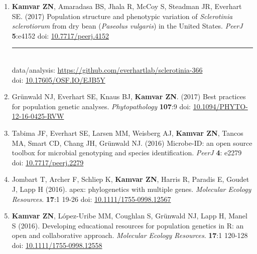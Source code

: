 \begin{enumerate}[leftmargin = 14pt]
	\vspace{3pt}
  
	\item \textbf{Kamvar ZN}, Amaradasa BS, Jhala R, McCoy S, Steadman JR,
	Everhart SE. (2017) Population structure and phenotypic variation of
	\textit{Sclerotinia sclerotiorum} from dry bean (\textit{Paseolus vulgaris})
	in the United States. \textit{PeerJ} \textbf{5}:e4152 doi: \href{https://doi.org/10.7717/peerj.4152}{10.7717/peerj.4152}\\
	\rule[0.25\baselineskip]{0.25\textwidth}{0.5pt}\\
	data/analysis: \href{https://github.com/everhartlab/sclerotinia-366#readme}{https://github.com/everhartlab/sclerotinia-366}\\
	doi:\phantom{t/analysis:}
	\href{https://doi.org/10.17605/OSF.IO/EJB5Y}{10.17605/OSF.IO/EJB5Y}

	\vspace{3pt}

	\item Gr\"unwald NJ, Everhart SE, Knaus BJ, \textbf{Kamvar ZN}. (2017)
	Best practices for population genetic analyses. \textit{Phytopathology}
	\textbf{107}:9 doi: \href{http://doi.org/10.1094/PHYTO-12-16-0425-RVW}{10.1094/PHYTO-12-16-0425-RVW}

	\vspace{3pt}

	\item Tabima JF, Everhart SE, Larsen MM, Weisberg AJ, \textbf{Kamvar ZN}, Tancos MA,
	Smart CD, Chang JH, Gr\"unwald NJ. (2016) Microbe-ID: an open source toolbox
	for microbial genotyping and species identification. \textit{PeerJ} \textbf{4}: e2279
	doi: \href{https://doi.org/10.7717/peerj.2279}{10.7717/peerj.2279}

	\vspace{3pt}

	\item Jombart T, Archer F, Schliep K, \textbf{Kamvar ZN}, Harris R, Paradis
	E, Goudet J, Lapp H (2016). apex: phylogenetics with multiple genes.
	\textit{Molecular Ecology Resources}. \textbf{17}:1 19-26 doi:
	\href{http://doi.org/10.1111/1755-0998.12567}{10.1111/1755-0998.12567}

	\vspace{3pt}

	\item \textbf{Kamvar ZN}, L\'opez-Uribe MM, Coughlan S, Gr\"unwald NJ, Lapp
	H, Manel S (2016). Developing educational resources for population genetics
	in R: an open and collaborative approach. \textit{Molecular Ecology Resources}.
	\textbf{17}:1 120-128 doi:
	\href{http://doi.org/10.1111/1755-0998.12558}{10.1111/1755-0998.12558}


\end{enumerate}
